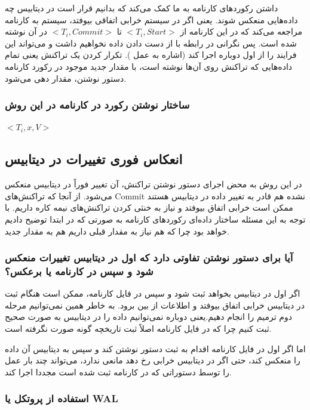 داشتن رکورد‌های کارنامه به ما کمک می‌کند که بدانیم قرار است در دیتابیس چه
داده‌هایی منعکس شوند. یعنی اگر در سیستم خرابی اتفاقی بیوفتد، سیستم به کارنامه
مراجعه می‌کند که در این کارنامه از $<T_i, Start>$ تا $<T_i, Commit>$ در آن نوشته
شده است. پس نگرانی در رابطه با از دست دادن داده نخواهیم داشت و می‌تواند این
فرایند را از اول دوباره اجرا کند (اشاره به عمل ). تکرار کردن یک تراکنش
یعنی تمام داده‌هایی که تراکنش روی آن‌ها نوشته است، با مقدار جدید موجود در رکورد
کارنامه دستور نوشتن، مقدار دهی می‌شود.

\subsubsection*{ساختار نوشتن رکورد در کارنامه در این روش}

$<T_i, x, V>$

\subsection{انعکاس فوری تغییرات در دیتابیس}

در این روش به محض اجرای دستور نوشتن تراکنش، آن تغییر فوراً در دیتابیس منعکس
می‌شود. از آنجا که تراکنش‌های Commit نشده هم قادر به تغییر داده در دیتابیس هستند
ممکن است خرابی اتفاق بیوفتد و نیاز به خنثی کردن تراکنش‌های نیمه کاره داریم. با
توجه به این مسئله ساختار داده‌ای رکورد‌های کارنامه به صورتی که در ابتدا توضیح
دادیم خواهد بود چرا که هم نیاز به مقدار قبلی داریم هم به مقدار جدید.

\subsubsection*{آیا برای دستور نوشتن تفاوتی دارد که اول در دیتابیس تغییرات منعکس
شود و سپس در کارنامه یا برعکس؟}

اگر اول در دیتابیس بخواهد ثبت شود و سپس در فایل کارنامه، ممکن است هنگام ثبت در
دیتابیس خرابی اتفاق بیوفتد و اطلاعات از بین برود. به خاطر همین نمی‌توانیم مرحله
دوم ترمیم را انجام دهیم.یعنی دوباره نمی‌توانیم داده را در دیتابیس به صورت صحیح
ثبت کنیم چرا که در فایل کارنامه اصلاً ثبت تاریخچه گونه صورت نگرفته است.

اما اگر اول در فایل کارنامه اقدام به ثبت دستور نوشتن کند و سپس به دیتابیس آن
داده را منعکس کند، حتی اگر در دیتابیس خرابی رخ دهد مانعی ندارد، می‌تواند چند بار
عمل  را توسط دستوراتی که در کارنامه ثبت شده است مجددا اجرا کند.

\subsubsection{استفاده از پروتکل  یا WAL}

